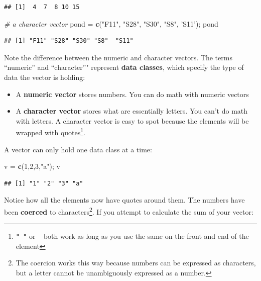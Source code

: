 \documentclass[]{book}
\newenvironment{Shaded}{\begin{snugshade}}{\end{snugshade}}
\newcommand{\CommentTok}[1]{\textcolor[rgb]{0.56,0.35,0.01}{\textit{#1}}}
\newcommand{\DecValTok}[1]{\textcolor[rgb]{0.00,0.00,0.81}{#1}}
\newcommand{\KeywordTok}[1]{\textcolor[rgb]{0.13,0.29,0.53}{\textbf{#1}}}
\newcommand{\NormalTok}[1]{#1}
\newcommand{\StringTok}[1]{\textcolor[rgb]{0.31,0.60,0.02}{#1}}
\providecommand{\tightlist}{%
  \setlength{\itemsep}{0pt}\setlength{\parskip}{0pt}}
\let\rmarkdownfootnote\footnote%
\def\footnote{\protect\rmarkdownfootnote}
\begin{document}
\begin{verbatim}
## [1]  4  7  8 10 15
\end{verbatim}

\begin{Shaded}
\begin{Highlighting}[]
\CommentTok{# a character vector}
\NormalTok{pond =}\StringTok{ }\KeywordTok{c}\NormalTok{(}\StringTok{"F11"}\NormalTok{, }\StringTok{"S28"}\NormalTok{, }\StringTok{"S30"}\NormalTok{, }\StringTok{"S8"}\NormalTok{, }\StringTok{'S11'}\NormalTok{); pond}
\end{Highlighting}
\end{Shaded}

\begin{verbatim}
## [1] "F11" "S28" "S30" "S8"  "S11"
\end{verbatim}

Note the difference between the numeric and character vectors. The terms ``numeric'' and ``character''" represent \textbf{data classes}, which specify the type of data the vector is holding:

\begin{itemize}
\tightlist
\item
  A \textbf{numeric vector} stores numbers. You can do math with numeric vectors
\item
  A \textbf{character vector} stores what are essentially letters. You can't do math with letters. A character vector is easy to spot because the elements will be wrapped with quotes\footnote{\texttt{"\ "} or \texttt{\textquotesingle{}\ \textquotesingle{}} both work as long as you use the same on the front and end of the element}.
\end{itemize}

A vector can only hold one data class at a time:

\begin{Shaded}
\begin{Highlighting}[]
\NormalTok{v =}\StringTok{ }\KeywordTok{c}\NormalTok{(}\DecValTok{1}\NormalTok{,}\DecValTok{2}\NormalTok{,}\DecValTok{3}\NormalTok{,}\StringTok{"a"}\NormalTok{); v}
\end{Highlighting}
\end{Shaded}

\begin{verbatim}
## [1] "1" "2" "3" "a"
\end{verbatim}

Notice how all the elements now have quotes around them. The numbers have been \textbf{coerced} to characters\footnote{The coercion works this way because numbers can be expressed as characters, but a letter cannot be unambiguously expressed as a number.}. If you attempt to calculate the sum of your vector:
\end{document}
